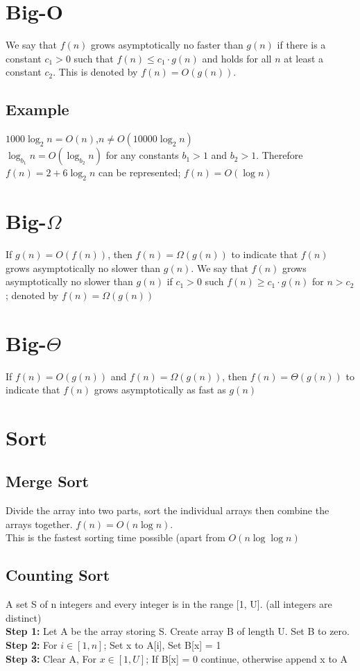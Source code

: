 \documentclass[5pt,a4paper]{article}
\begin{document}
\begin{multicols}{3}
    \section{Big-O}
    We say that $f(n)$ grows asymptotically no faster than $g(n)$ if there is a constant $c_1>0$ such that $f(n)\leq c_1\cdot g(n)$ and holds for all $n$ at least a constant $c_2$. This is denoted by $f(n)=O(g(n))$.
    \subsection{Example}
    $1000\log_2n=O(n)$,$n\neq O(10000\log_2n)$\\
    $\log_{b_1}n=O(\log_{b_2}n)$ for any constants $b_1>1$ and $b_2>1$.
    Therefore $f(n)=2+6\log_2n$ can be represented; $f(n)=O(\log n)$
    \section{Big-$\Omega$}
    If $g(n)=O(f(n))$, then $f(n)=\Omega(g(n))$ to indicate that $f(n)$ grows asymptotically no slower than $g(n)$. We say that $f(n)$ grows asymptotically no slower than $g(n)$ if $c_1>0$ such $f(n)\geq c_1\cdot g(n)$ for $n>c_2$; denoted by $f(n)=\Omega(g(n))$
    \section{Big-$\Theta$}
    If $f(n)=O(g(n))$ and $f(n)=\Omega(g(n))$, then $f(n)=\Theta(g(n))$ to indicate that $f(n)$ grows asymptotically as fast as $g(n)$

    \section{Sort}
    \subsection{Merge Sort}
    Divide the array into two parts, sort the individual arrays then combine the arrays together.
    $f(n)=O(n\log n)$.\\
    This is the fastest sorting time possible (apart from $O(n\log\log n)$
    \subsection{Counting Sort}
    A set S of n integers and every integer is in the range [1, U]. (all integers are distinct)\\
    \textbf{Step 1:} Let A be the array storing S. Create array B of length U. Set B to zero.\\
    \textbf{Step 2:} For $i\in [1,n]$; Set x to A[i], Set B[x] = 1\\
    \textbf{Step 3:} Clear A, For $x\in[1,U]$; If B[x] = 0 continue, otherwise append x to A

\end{multicols}
\end{document}
